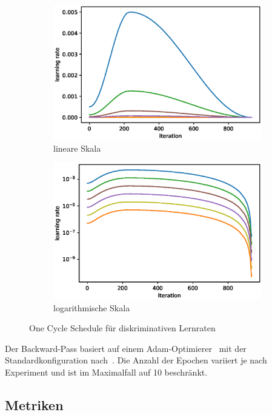 \begin{figure}
    \centering
    \begin{subfigure}{.5\textwidth}
        \centering
        \includegraphics[width=.9\linewidth]{img/06_one_cycle_lin.eps}
        \caption{lineare Skala}
    \end{subfigure}%
    \begin{subfigure}{.5\textwidth}
        \centering
        \includegraphics[width=.9\linewidth]{img/06_one_cycle_log.eps}
        \caption{logarithmische Skala}
    \end{subfigure}
    \caption{One Cycle Schedule für diskriminativen Lernraten}
    \label{fig:one-cylce}
\end{figure}

Der Backward-Pass basiert auf einem Adam-Optimierer~\cite{Kingma14} mit der Standardkonfiguration nach~\cite{Gugger20}.
Die Anzahl der Epochen variiert je nach Experiment und ist im Maximalfall auf 10 beschränkt.

\subsection{Metriken}
\label{subsec:metriken}

